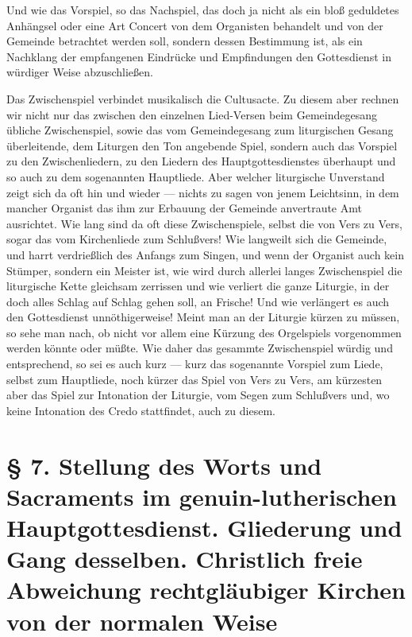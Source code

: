 Und wie das Vorspiel, so das Nachspiel, das doch ja nicht als ein bloß geduldetes Anhängsel oder eine Art Concert von dem Organisten behandelt und von der Gemeinde betrachtet werden soll, sondern dessen Bestimmung ist, als ein Nachklang der empfangenen Eindrücke und Empfindungen den Gottesdienst in würdiger Weise abzuschließen.

Das Zwischenspiel verbindet musikalisch die Cultusacte. Zu diesem aber rechnen wir nicht nur das zwischen den einzelnen Lied-Versen beim Gemeindegesang übliche Zwischenspiel, sowie das vom Gemeindegesang zum liturgischen Gesang überleitende, dem Liturgen den Ton angebende Spiel, sondern auch das Vorspiel zu den Zwischenliedern, zu den Liedern des Hauptgottesdienstes überhaupt und so auch zu dem sogenannten Hauptliede. Aber welcher liturgische Unverstand zeigt sich da oft hin und wieder — nichts zu sagen von jenem Leichtsinn, in dem mancher Organist das ihm zur Erbauung der Gemeinde anvertraute Amt ausrichtet. Wie lang sind da oft diese Zwischenspiele, selbst die von Vers zu Vers, sogar das vom Kirchenliede zum Schlußvers! Wie langweilt
sich die Gemeinde, und harrt verdrießlich des Anfangs zum Singen, und wenn der Organist auch kein Stümper, sondern ein Meister ist, wie wird durch allerlei langes Zwischenspiel die liturgische Kette gleichsam zerrissen und wie verliert die ganze Liturgie, in der doch alles Schlag auf Schlag gehen soll, an Frische! Und wie verlängert es auch den Gottesdienst unnöthigerweise! Meint man an der Liturgie kürzen zu müssen, so sehe man nach, ob nicht vor allem eine Kürzung des Orgelspiels vorgenommen werden könnte oder müßte. Wie daher das gesammte Zwischenspiel würdig und entsprechend, so sei es auch kurz — kurz das sogenannte Vorspiel zum Liede, selbst zum Hauptliede, noch kürzer das Spiel von Vers zu Vers, am kürzesten aber das Spiel zur Intonation der Liturgie, vom Segen zum Schlußvers und, wo keine Intonation des Credo stattfindet, auch zu diesem.

\chapter[§ 7. Stellung des Worts und Sacraments]{§ 7. Stellung des Worts und Sacraments im genuin-lutherischen Hauptgottesdienst. Gliederung und Gang desselben. Christlich freie Abweichung rechtgläubiger Kirchen von der normalen Weise}


